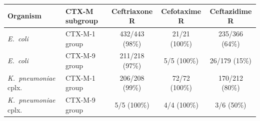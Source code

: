 \begin{tabular}{llccc}
\hline\hline
Organism & CTX-M subgroup & Ceftriaxone R & Cefotaxime R & Ceftazidime R \\
\hline
\textit{E.~coli} & CTX-M-1 group & 432/443 (98\%) & 21/21 (100\%) & 235/366 (64\%) \\
\textit{E.~coli} & CTX-M-9 group & 211/218 (97\%) & 5/5 (100\%) & 26/179 (15\%) \\
\textit{K.~pneumoniae} cplx. & CTX-M-1 group & 206/208 (99\%) & 72/72 (100\%) & 170/212 (80\%) \\
\textit{K.~pneumoniae} cplx. & CTX-M-9 group & 5/5 (100\%) & 4/4 (100\%) & 3/6 (50\%) \\
\hline\hline
\end{tabular}
